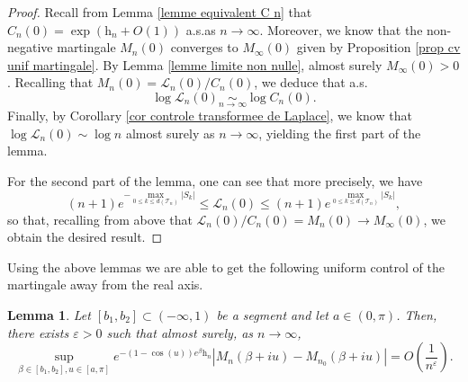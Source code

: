\documentclass[11pt]{article}
\newtheorem{lemma}[theorem]{Lemma}
\numberwithin{equation}{section}
\def\vp{\varepsilon}
\def \T{\mathcal{T}}
\def \cL{\mathcal{L}}
\begin{document}
\begin{proof}
	Recall from Lemma \ref{lemme equivalent C n} that $C_n(0) = \exp(\mathrm{h}_n +O(1))$ a.s.\@ as $n\to \infty$. Moreover, we know that the non-negative martingale $M_n(0)$ converges to $M_\infty(0)$ given by Proposition \ref{prop cv unif martingale}. By Lemma \ref{lemme limite non nulle}, almost surely $M_\infty(0) > 0$. Recalling that $M_n(0) = \cL_n(0)/C_n(0)$, we deduce that a.s.
	\[
	\log \cL_n(0) \mathop{\sim}\limits_{n\to \infty} \log C_n(0).
	\]
	Finally, by Corollary \ref{cor controle transformee de Laplace}, we know that $\log \cL_n(0) \sim \log n$ almost surely as $n\to \infty$, yielding the first part of the lemma.
	
	For the second part of the lemma, one can see that more precisely, we have
	\[
	(n+1)e^{-\max_{0 \le k\le d(\T_n)} \vert S_k\vert }\le \cL_n(0) \le (n+1)e^{\max_{0 \le k\le d(\T_n)} \vert S_k\vert },
	\]
	so that, recalling from above that $\cL_n(0)/C_n(0) = M_n(0) \to M_\infty(0)$, we obtain the desired result.
\end{proof}
Using the above lemmas we are able to get the following uniform control of the martingale away from the real axis.
\begin{lemma}\label{lemme controle uniforme martingale queue}
	Let $[b_1,b_2] \subset (-\infty, 1)$ be a segment and let $a \in (0,\pi)$. Then, there exists $\vp>0$ such that almost surely, as $n\to \infty$,
	\[ \sup_{\beta \in [b_1, b_2], u \in [a, \pi]} 
	e^{-(1-\cos(u))e^\beta \mathrm{h}_n} \left\vert M_n(\beta +iu)-M_{n_0}(\beta +iu) \right\vert  = O\left( \frac{1}{n^\vp}\right).
	\]
\end{lemma}
\end{document}
